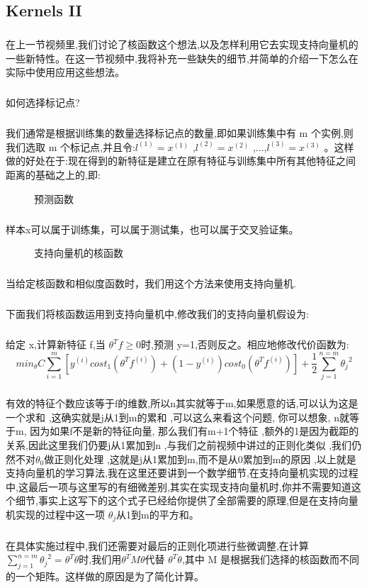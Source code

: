 \documentclass{article}
\begin{document}
\begin{CJK}{UTF8}{gbsn}
\subsection{Kernels II}
\subparagraph{}
在上一节视频里,我们讨论了核函数这个想法,以及怎样利用它去实现支持向量机的一些新特性。在这一节视频中,我将补充一些缺失的细节,并简单的介绍一下怎么在实际中使用应用这些想法。
\subparagraph{}
如何选择标记点?
\subparagraph{}
我们通常是根据训练集的数量选择标记点的数量,即如果训练集中有 m 个实例,则我们选取 m 个标记点,并且令:$l^{(1)}=x^{(1)}$ ,$l^{(2)}=x^{(2)}$ ,...,$l^{(3)}=x^{(3)}$ 。这样做的好处在于:现在得到的新特征是建立在原有特征与训练集中所有其他特征之间距离的基础之上的,即:
\begin{figure}[H]
\label{fig:747}
\end{figure}
\begin{figure}[H]
\label{fig:741}
\caption{预测函数}
\end{figure}
\subparagraph{}
样本x可以属于训练集，可以属于测试集，也可以属于交叉验证集。
\begin{figure}[H]
\label{fig:743}
\caption{支持向量机的核函数}
\end{figure}
\subparagraph{}
当给定核函数和相似度函数时，我们用这个方法来使用支持向量机.
\subparagraph{}
下面我们将核函数运用到支持向量机中,修改我们的支持向量机假设为:
\subparagraph{}
给定 x,计算新特征 f,当 $\theta^Tf\geqslant{0}$时,预测 y=1,否则反之。相应地修改代价函数为:
\begin{equation}
min_{\theta}C\sum_{i=1}^m[y^{(i)}cost_1(\theta^Tf^{(i)})+(1-y^{(i)})cost_0(\theta^Tf^{(i)})]+\frac{1}{2}\sum_{j=1}^{n=m}{\theta_j}^2
\end{equation}
\subparagraph{}
有效的特征个数应该等于f的维数,所以n其实就等于m,如果愿意的话,可以认为这是一个求和 ,这确实就是j从1到m的累和 ,可以这么来看这个问题, 你可以想象, n就等于m, 因为如果f不是新的特征向量, 那么我们有m+1个特征 ,额外的1是因为截距的关系,因此这里我们仍要j从1累加到n ,与我们之前视频中讲过的正则化类似 ,我们仍然不对$\theta_0$做正则化处理 ,这就是j从1累加到m,而不是从0累加到m的原因 ,以上就是支持向量机的学习算法,我在这里还要讲到一个数学细节,在支持向量机实现的过程中,这最后一项与这里写的有细微差别,其实在实现支持向量机时,你并不需要知道这个细节,事实上这写下的这个式子已经给你提供了全部需要的原理,但是在支持向量机实现的过程中这一项 $\theta_j$从1到m的平方和。
\subparagraph{}
在具体实施过程中,我们还需要对最后的正则化项进行些微调整,在计算$\sum_{j=1}^{n=m}{\theta_j}^2=\theta^T\theta$时,我们用$\theta^TM\theta$代替 $\theta^T\theta$,其中 M 是根据我们选择的核函数而不同的一个矩阵。这样做的原因是为了简化计算。

\end{CJK}
\end{document}
